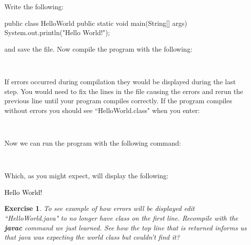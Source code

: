 \documentclass[oneside]{book}
\newcommand{\commandline}[1]{\begin{center} \colorbox{Dark}{\textcolor{white}{#1}} \end{center}}
\newcommand{\exampleout}[1]{\begin{center} \colorbox{Light}{\textcolor{black}{#1}} \end{center}}
\newtheorem{ex}{Exercise}[chapter]
\begin{document}
Write the following:

\begin{verbatimtab}
    public class HelloWorld {
        public static void main(String[] args) {
            System.out.println("Hello World!");
        }
    }
\end{verbatimtab}
and save the file. Now compile the program with the following:
\commandline{javac HelloWorld.java}
If errors occurred during compilation they would be displayed during the last step. You would need to fix the lines in the file causing the errors and rerun the previous line until your program compiles correctly. If the program compiles without errors you should see ``HelloWorld.class" when you enter:
\commandline{ls}
Now we can run the program with the following command:
\commandline{java HelloWorld}
Which, as you might expect, will display the following:
\exampleout{Hello World!}

\vspace{0.5cm}

\begin{ex}
    To see example of how errors will be displayed edit ``HelloWorld.java" to no longer have class on the first line. Recompile with the \textbf{javac} command we just learned. See how the top line that is returned informs us that java was expecting the world class but couldn't find it?
\end{ex}

    
\end{document}
